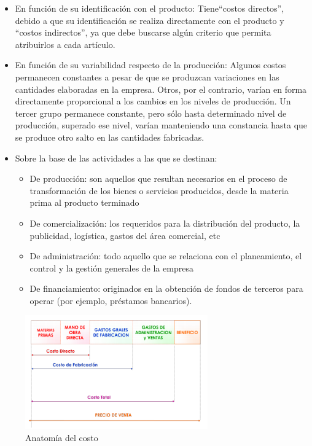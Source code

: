 \documentclass[titlepage,a4paper]{article}
\begin{document}
\begin{itemize}
    \item En función de su identificación con el producto: Tiene“costos directos”, debido a que su identificación se realiza directamente con el producto y “costos indirectos”, ya que debe buscarse algún criterio que permita atribuirlos a cada artículo.
    \item En función de su variabilidad respecto de la producción: Algunos costos permanecen constantes a pesar de que se produzcan variaciones en las cantidades elaboradas en la empresa. Otros, por el contrario, varían en forma directamente proporcional a los cambios en los niveles de producción. Un tercer grupo permanece constante, pero sólo hasta determinado nivel de producción, superado ese nivel, varían manteniendo una constancia hasta que se produce otro salto en las cantidades fabricadas.
    \item Sobre la base de las actividades a las que se destinan:
    \begin{itemize}
        \item De producción: son aquellos que resultan necesarios en el proceso de transformación de los bienes o servicios producidos, desde la materia prima al producto terminado
        \item De comercialización: los requeridos para la distribución del producto, la publicidad, logística, gastos del área comercial, etc
        \item De administración: todo aquello que se relaciona con el planeamiento, el control y la gestión generales de la empresa
        \item De financiamiento: originados en la obtención de fondos de terceros para operar (por ejemplo, préstamos bancarios). 
    \end{itemize}
\end{itemize}

\begin{figure}[!htb]
    \centering
    \includegraphics[width=0.7\textwidth]{imagenes/AnatomiaCosto.PNG}
    \caption{Anatomía del costo}
\end{figure}
\end{document}
